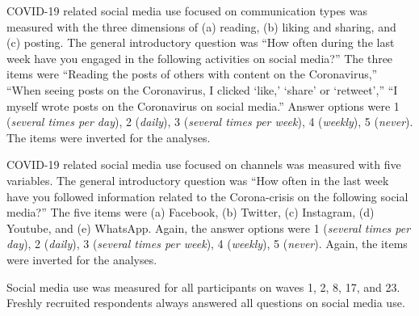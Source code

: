 \documentclass[
  english,
  man,mask,floatsintext]{apa6}
\begin{document}
COVID-19 related social media use focused on communication types was measured with the three dimensions of (a) reading, (b) liking and sharing, and (c) posting.
The general introductory question was ``How often during the last week have you engaged in the following activities on social media?''
The three items were ``Reading the posts of others with content on the Coronavirus,'' ``When seeing posts on the Coronavirus, I clicked `like,' `share' or `retweet','' ``I myself wrote posts on the Coronavirus on social media.''
Answer options were 1 (\emph{several times per day}), 2 (\emph{daily}), 3 (\emph{several times per week}), 4 (\emph{weekly}), 5 (\emph{never}).
The items were inverted for the analyses.

COVID-19 related social media use focused on channels was measured with five variables.
The general introductory question was ``How often in the last week have you followed information related to the Corona-crisis on the following social media?''
The five items were (a) Facebook, (b) Twitter, (c) Instagram, (d) Youtube, and (e) WhatsApp.
Again, the answer options were 1 (\emph{several times per day}), 2 (\emph{daily}), 3 (\emph{several times per week}), 4 (\emph{weekly}), 5 (\emph{never}).
Again, the items were inverted for the analyses.

Social media use was measured for all participants on waves 1, 2, 8, 17, and 23.
Freshly recruited respondents always answered all questions on social media use.
\end{document}
